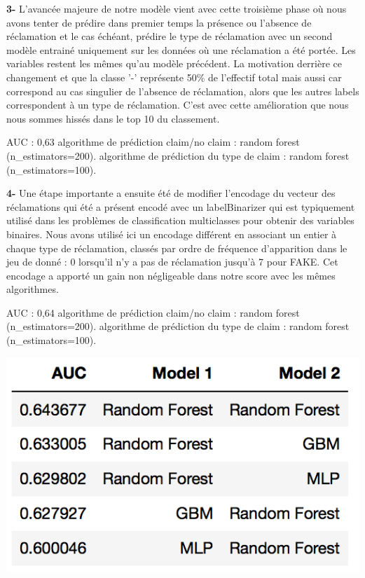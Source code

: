 \textbf{3-} L'avancée majeure de notre modèle vient avec cette troisième phase où nous avons
tenter de prédire dans premier temps la présence ou l'absence de réclamation et le cas 
échéant, prédire le type de réclamation avec un second modèle entrainé uniquement sur les
données où une réclamation a été portée. Les variables restent les mêmes qu'au modèle
précédent. La motivation derrière ce changement et que la classe '-' représente 50\%
de l'effectif total mais aussi car correspond au cas singulier de l'absence de réclamation, 
alors que les autres labels correspondent à un type de réclamation.
C'est avec cette amélioration que nous nous sommes hissés dans le top 10 du classement.

AUC : 0,63
algorithme de prédiction claim/no claim : random forest (n_estimators=200).
algorithme de prédiction du type de claim : random forest (n_estimators=100).

\textbf{4-} Une étape importante a ensuite été de modifier l'encodage du vecteur des
réclamations qui été a présent encodé avec un labelBinarizer qui est typiquement utilisé
dans les problèmes de classification multiclasses pour obtenir des variables binaires.
Nous avons utilisé ici un encodage différent en associant un entier à chaque type de
réclamation, classés par ordre de fréquence d'apparition dans le jeu de donné : 0 lorsqu'il
n'y a pas de réclamation jusqu'à 7 pour FAKE. Cet encodage a apporté un gain non négligeable
dans notre score avec les mêmes algorithmes.

AUC : 0,64
algorithme de prédiction claim/no claim : random forest (n_estimators=200).
algorithme de prédiction du type de claim : random forest (n_estimators=100).

\begin{center}
\includegraphics[scale=0.5]{assets/auc2} 
\end{center}


